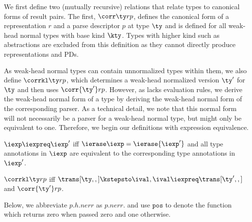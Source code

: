 We first define two (mutually recursive) relations that relate types
to canonical forms of result pairs.  The first, $\corr \ty r p$,
defines the canonical form of a representation $r$ and a parse
descriptor $p$ at type $\ty$ and is defined for all weak-head normal
types with base kind $\kty$.  Types with higher kind such as
abstractions are excluded from this definition as they cannot directly
produce representations and PDs.  

As weak-head normal types can contain unnormalized types within them,
we also define $\corrkl \ty r p$, which determines a weak-head
normalized version $\ty'$ for $\ty$ and then uses $\corr {\ty'} r p$.
However, as \ddc{} lacks evaluation rules, we derive the weak-head
normal form of a type by deriving the weak-head normal form of the
corresponding parser. As a technical detail, we note that this normal
form will not necessarily be a parser for a weak-head normal \ddc{}
type, but might only be equivalent to one. Therefore, we begin our
definitions with expression equivalence.

\begin{definition}
  $\iexp \iexpreq \iexp'$ iff $\ierase \iexp = \ierase {\iexp'}$ and
all type annotations in $\iexp$ are equivalent to
the corresponding type annotations in $\iexp'$.
\label{def:op-eq}
\end{definition}

\begin{definition}
$\corrkl \ty r p$ iff $\trans[\ty,,] \kstepsto \ival, \ival \iexpreq
\trans[\ty',,]$ and $\corr {\ty'} r p$.
\end{definition}

Below, we abbreviate $p.h.{nerr}$ as
$p.{nerr}$.  and use $\mathtt{pos}$ to denote the function which
returns zero when passed zero and one otherwise.

